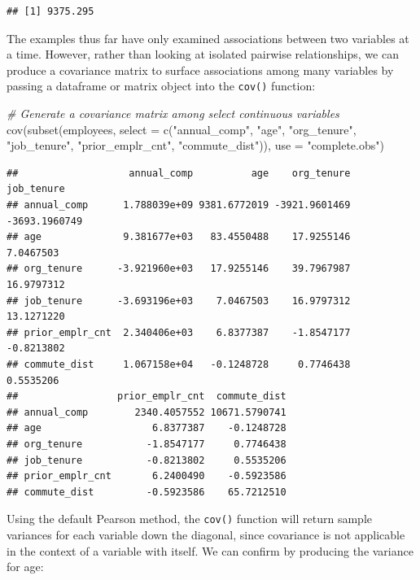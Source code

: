 \documentclass[
]{book}
\newenvironment{Shaded}{\begin{snugshade}}{\end{snugshade}}
\newcommand{\AttributeTok}[1]{\textcolor[rgb]{0.77,0.63,0.00}{#1}}
\newcommand{\CommentTok}[1]{\textcolor[rgb]{0.56,0.35,0.01}{\textit{#1}}}
\newcommand{\FunctionTok}[1]{\textcolor[rgb]{0.00,0.00,0.00}{#1}}
\newcommand{\NormalTok}[1]{#1}
\newcommand{\StringTok}[1]{\textcolor[rgb]{0.31,0.60,0.02}{#1}}
\begin{document}
\begin{verbatim}
## [1] 9375.295
\end{verbatim}

The examples thus far have only examined associations between two variables at a time. However, rather than looking at isolated pairwise relationships, we can produce a covariance matrix to surface associations among many variables by passing a dataframe or matrix object into the \texttt{cov()} function:

\begin{Shaded}
\begin{Highlighting}[]
\CommentTok{\# Generate a covariance matrix among select continuous variables}
\FunctionTok{cov}\NormalTok{(}\FunctionTok{subset}\NormalTok{(employees, }\AttributeTok{select =} \FunctionTok{c}\NormalTok{(}\StringTok{"annual\_comp"}\NormalTok{, }\StringTok{"age"}\NormalTok{, }\StringTok{"org\_tenure"}\NormalTok{, }\StringTok{"job\_tenure"}\NormalTok{, }\StringTok{"prior\_emplr\_cnt"}\NormalTok{, }\StringTok{"commute\_dist"}\NormalTok{)), }\AttributeTok{use =} \StringTok{"complete.obs"}\NormalTok{)}
\end{Highlighting}
\end{Shaded}

\begin{verbatim}
##                   annual_comp          age    org_tenure    job_tenure
## annual_comp      1.788039e+09 9381.6772019 -3921.9601469 -3693.1960749
## age              9.381677e+03   83.4550488    17.9255146     7.0467503
## org_tenure      -3.921960e+03   17.9255146    39.7967987    16.9797312
## job_tenure      -3.693196e+03    7.0467503    16.9797312    13.1271220
## prior_emplr_cnt  2.340406e+03    6.8377387    -1.8547177    -0.8213802
## commute_dist     1.067158e+04   -0.1248728     0.7746438     0.5535206
##                 prior_emplr_cnt  commute_dist
## annual_comp        2340.4057552 10671.5790741
## age                   6.8377387    -0.1248728
## org_tenure           -1.8547177     0.7746438
## job_tenure           -0.8213802     0.5535206
## prior_emplr_cnt       6.2400490    -0.5923586
## commute_dist         -0.5923586    65.7212510
\end{verbatim}

Using the default Pearson method, the \texttt{cov()} function will return sample variances for each variable down the diagonal, since covariance is not applicable in the context of a variable with itself. We can confirm by producing the variance for age:
\end{document}
